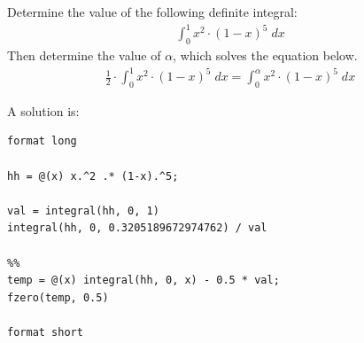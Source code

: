 \begin{ex}
Determine the value of the following definite integral:
\begin{align*}
\int_0^1 x^2 \cdot  (1 - x)^5 \; dx
\end{align*}
Then determine the value of $\alpha$, which solves the 
equation below.
\begin{align*}
\frac{1}{2} \cdot \int_0^1 x^2 \cdot  (1 - x)^5 \; dx = \int_0^\alpha x^2 \cdot  (1 - x)^5 \; dx
\end{align*}
\begin{hint}
\end{hint}
\begin{sol}
A solution is:
\begin{lstlisting}
format long

hh = @(x) x.^2 .* (1-x).^5;

val = integral(hh, 0, 1)
integral(hh, 0, 0.3205189672974762) / val

%%
temp = @(x) integral(hh, 0, x) - 0.5 * val;
fzero(temp, 0.5)

format short
\end{lstlisting}
\end{sol}
\end{ex}

